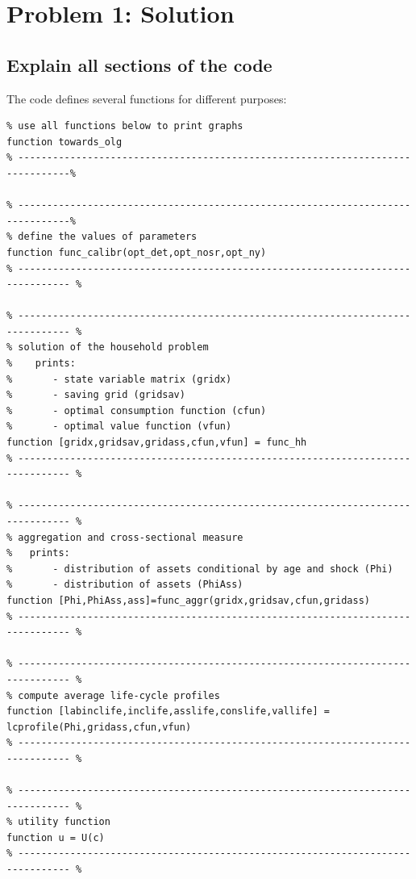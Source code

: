\documentclass[12pt,a4paper]{article}
\begin{document}
\newpage


\section*{Problem 1: Solution}

\subsection*{Explain all sections of the code}

The code defines several functions for different purposes:

\begin{lstlisting}[frame=single]
% -------------------------------------------------------------------------------%
% use all functions below to print graphs
function towards_olg
% -------------------------------------------------------------------------------%

% -------------------------------------------------------------------------------%
% define the values of parameters
function func_calibr(opt_det,opt_nosr,opt_ny)
% ------------------------------------------------------------------------------- %

% ------------------------------------------------------------------------------- %
% solution of the household problem
%    prints:
%       - state variable matrix (gridx)
%       - saving grid (gridsav)
%       - optimal consumption function (cfun)
%       - optimal value function (vfun)
function [gridx,gridsav,gridass,cfun,vfun] = func_hh
% ------------------------------------------------------------------------------- %

% ------------------------------------------------------------------------------- %
% aggregation and cross-sectional measure
%   prints:
%       - distribution of assets conditional by age and shock (Phi)
%       - distribution of assets (PhiAss)
function [Phi,PhiAss,ass]=func_aggr(gridx,gridsav,cfun,gridass)
% ------------------------------------------------------------------------------- %

% ------------------------------------------------------------------------------- %
% compute average life-cycle profiles
function [labinclife,inclife,asslife,conslife,vallife] = lcprofile(Phi,gridass,cfun,vfun)
% ------------------------------------------------------------------------------- %

% ------------------------------------------------------------------------------- %
% utility function
function u = U(c)
% ------------------------------------------------------------------------------- %
\end{lstlisting}
\end{document}
